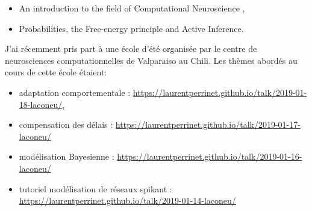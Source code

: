 \begin{itemize}
	\item An introduction to the field of Computational Neuroscience , 
	\item Probabilities, the Free-energy principle and Active Inference.
\end{itemize}


J'ai récemment pris part à une école d'été organisée par le centre de neurosciences computationnelles de Valparaiso au Chili. Les thèmes abordés au cours de cette école étaient:
\begin{itemize}
	\item adaptation comportementale : \url{https://laurentperrinet.github.io/talk/2019-01-18-laconeu/}, 
	\item compensation des délais : \url{https://laurentperrinet.github.io/talk/2019-01-17-laconeu/}
	\item modélisation Bayesienne : \url{https://laurentperrinet.github.io/talk/2019-01-16-laconeu/}
	\item tutoriel modélisation de réseaux spikant : \url{https://laurentperrinet.github.io/talk/2019-01-14-laconeu/}
 
\end{itemize}


%
%
%
% 

